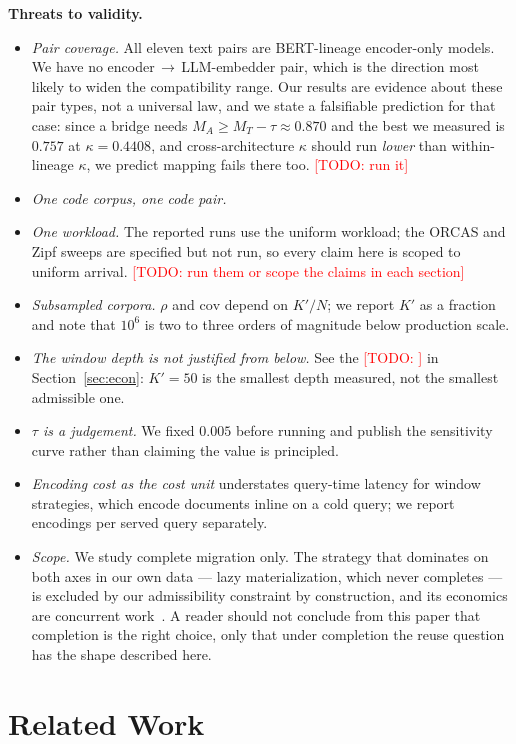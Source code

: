 \documentclass[conference]{IEEEtran}
\newcommand{\todo}[1]{\textcolor{red}{[TODO: #1]}}
\newcommand{\cov}{\mathrm{cov}}
\begin{document}
\textbf{Threats to validity.}
\begin{itemize}
\item \emph{Pair coverage.} All eleven text pairs are BERT-lineage encoder-only models.
We have no encoder\,$\to$\,LLM-embedder pair, which is the direction most likely to widen
the compatibility range. Our results are evidence about these pair types, not a universal
law, and we state a falsifiable prediction for that case: since a bridge needs
$M_A \ge M_T - \tau \approx 0.870$ and the best we measured is $0.757$ at $\kappa =
0.4408$, and cross-architecture $\kappa$ should run \emph{lower} than within-lineage
$\kappa$, we predict mapping fails there too. \todo{run it}
\item \emph{One code corpus, one code pair.}
\item \emph{One workload.} The reported runs use the uniform workload; the ORCAS and Zipf
sweeps are specified but not run, so every claim here is scoped to uniform arrival.
\todo{run them or scope the claims in each section}
\item \emph{Subsampled corpora.} $\rho$ and $\cov$ depend on $K'/N$; we report $K'$ as a
fraction and note that $10^6$ is two to three orders of magnitude below production scale.
\item \emph{The window depth is not justified from below.} See the \todo{} in
Section~\ref{sec:econ}: $K' = 50$ is the smallest depth measured, not the smallest
admissible one.
\item \emph{$\tau$ is a judgement.} We fixed $0.005$ before running and publish the
sensitivity curve rather than claiming the value is principled.
\item \emph{Encoding cost as the cost unit} understates query-time latency for window
strategies, which encode documents inline on a cold query; we report encodings per served
query separately.
\item \emph{Scope.} We study complete migration only. The strategy that dominates on both
axes in our own data --- lazy materialization, which never completes --- is excluded by
our admissibility constraint by construction, and its economics are concurrent
work~\cite{thaw-anon}. A reader should not conclude from this paper that completion is
the right choice, only that under completion the reuse question has the shape described
here.
\end{itemize}

\section{Related Work}\label{sec:related}
\end{document}
